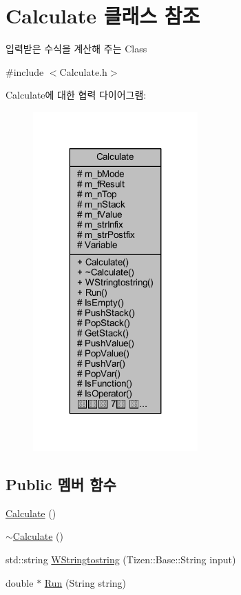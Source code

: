 \hypertarget{class_calculate}{\section{Calculate 클래스 참조}
\label{class_calculate}
}


입력받은 수식을 계산해 주는 Class  




{\ttfamily \#include $<$Calculate.\+h$>$}



Calculate에 대한 협력 다이어그램\+:
\nopagebreak
\begin{figure}[H]
\begin{center}
\leavevmode
\includegraphics[width=179pt]{class_calculate__coll__graph}
\end{center}
\end{figure}
\subsection*{Public 멤버 함수}
\begin{DoxyCompactItemize}
\item 
\hyperlink{class_calculate_a9324cfcffaf7004813243ab39b003c66}{Calculate} ()
\item 
\hyperlink{class_calculate_aeb9c1ffe2bcc1bb58c1c2c591c0e8827}{$\sim$\+Calculate} ()
\item 
std\+::string \hyperlink{class_calculate_a50d0dfb999edd48ae45b8023e6a69d6a}{W\+Stringtostring} (Tizen\+::\+Base\+::\+String input)
\item 
double $\ast$ \hyperlink{class_calculate_a0ad76f7ee31bea1dec46e560d10fca75}{Run} (String string)
\end{DoxyCompactItemize}

